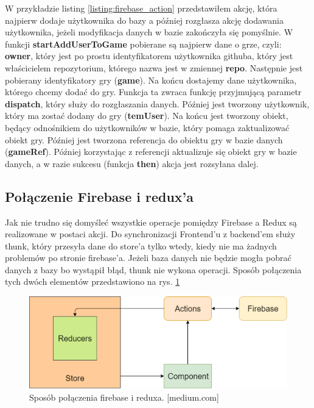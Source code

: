 W przykładzie listing \ref{listing:firebase_action} przedstawiłem akcję, która najpierw dodaje użytkownika do bazy a później rozgłasza akcję dodawania użytkownika, jeżeli modyfikacja danych w bazie zakończyła się pomyślnie. W funkcji \textbf{startAddUserToGame} pobierane są najpierw dane o grze, czyli: \textbf{owner}, który jest po prostu identyfikatorem użytkownika githuba, który jest właścicielem repozytorium, którego nazwa jest w zmiennej \textbf{repo}. Następnie jest pobierany identyfikatory gry (\textbf{game}). Na końcu dostajemy dane użytkownika, którego chcemy dodać do gry. Funkcja ta zwraca funkcję przyjmującą parametr \textbf{dispatch}, który służy do rozgłaszania danych. Później jest tworzony użytkownik, który ma zostać dodany do gry (\textbf{temUser}). Na końcu jest tworzony obiekt, będący odnośnikiem do użytkowników w bazie, który pomaga zaktualizować obiekt gry. Później jest tworzona referencja do obiektu gry w bazie danych (\textbf{gameRef}). Później korzystając z referencji aktualizuje się obiekt gry w bazie danych, a w razie sukcesu (funkcja \textbf{then}) akcja jest rozsyłana dalej.

\subsection{Połączenie Firebase i redux’a
}

Jak nie trudno się domyśleć wszystkie operacje pomiędzy Firebase a Redux są realizowane w postaci akcji. Do synchronizacji Frontend’u z backend’em służy thunk, który przesyła dane do store’a tylko wtedy, kiedy nie ma żadnych problemów po stronie firebase’a. Jeżeli baza danych nie będzie mogła pobrać danych z bazy bo wystąpił błąd, thunk nie wykona operacji. Sposób połączenia tych dwóch elementów przedstawiono na rys. \ref{rys:fireRedux} 

\begin{figure}
	\centering\includegraphics[width=.6\textwidth]{img/fireRedux}
	\caption{Sposób połączenia firebase i reduxa. [medium.com]}\label{rys:fireRedux}%
\end{figure}
